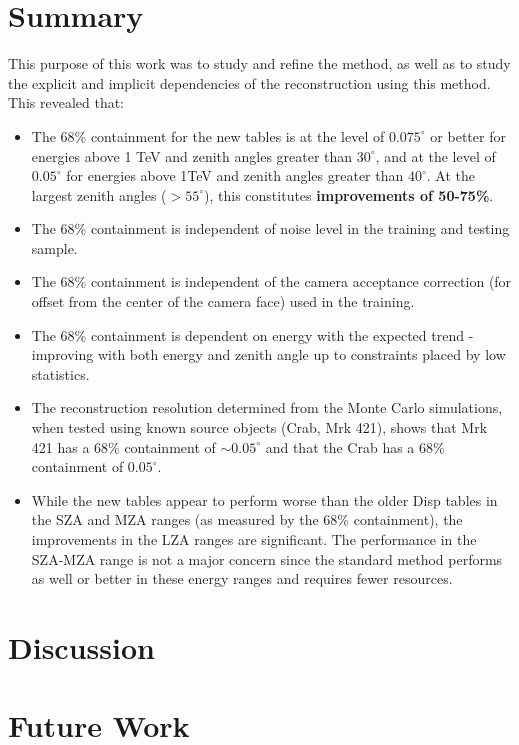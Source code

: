 \documentclass[main.tex]{subfiles}
\begin{document}
\section{Summary}
This purpose of this work was to study and refine the \disp method, as well as to study the explicit and implicit dependencies of the reconstruction using this method. This revealed that:

\begin{itemize}
\item The 68\% containment for the new \disp tables is at the level of $0.075^\circ$ or better for energies above 1 TeV and zenith angles greater than $30^\circ$, and at the level of $0.05^\circ$ for energies above 1TeV and zenith angles greater than $40^\circ$. At the largest zenith angles ($>55^\circ$), this constitutes {\bf improvements of 50-75\%}.
\item The 68\% containment is independent of noise level in the training and testing sample.
\item The 68\% containment is independent of the camera acceptance correction (for offset from the center of the camera face) used in the training.
\item The 68\% containment is dependent on energy with the expected trend - improving with both energy and zenith angle up to constraints placed by low statistics.
\item The reconstruction resolution determined from the Monte Carlo simulations, when tested using known source objects (Crab, Mrk 421), shows that Mrk 421 has a 68\% containment of $\sim 0.05^\circ$ and that the Crab has a 68\% containment of $0.05^\circ$.
\item While the new \disp tables appear to perform worse than the older Disp tables in the SZA and MZA ranges (as measured by the 68\% containment), the improvements in the LZA ranges are significant. The performance in the SZA-MZA range is not a major concern since the standard method performs as well or better in these energy ranges and requires fewer resources.

\end{itemize}

\section{Discussion}


\section{Future Work}
\end{document}
